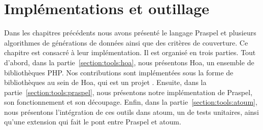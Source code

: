 \chapter{Implémentations et outillage}
\label{chapter:tools}

\mminitoc

Dans les chapitres précédents nous avons présenté le langage Praspel et
plusieurs algorithmes de générations de données ainsi que des critères de
couverture. Ce chapitre est consacré à leur implémentation. Il est organisé en
trois parties. Tout d'abord, dans la partie~\ref{section:tools:hoa}, nous
présentons Hoa, un ensemble de bibliothèques PHP. Nos contributions sont
implémentées sous la forme de bibliothèques au sein de Hoa, qui est un projet
. Ensuite, dans la partie~\ref{section:tools:praspel},
nous présentons notre implémentation de Praspel, son fonctionnement et son
découpage. Enfin, dans la partie~\ref{section:tools:atoum}, nous présentons
l'intégration de ces outils dans atoum, un  de tests
unitaires, ainsi qu'une extension qui fait le pont entre Praspel et atoum.

